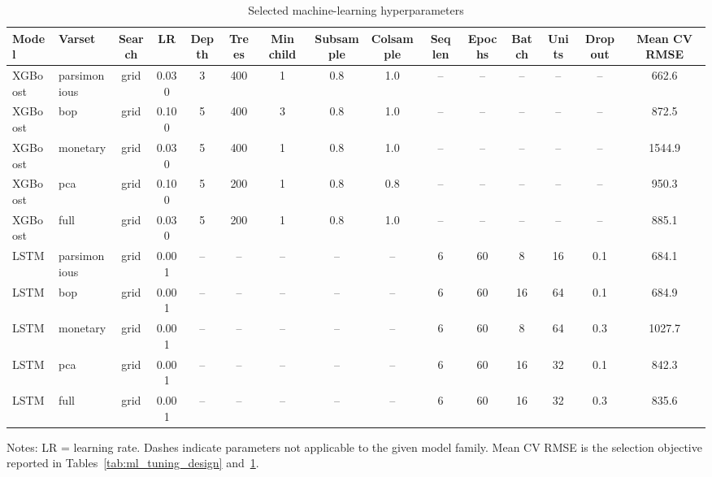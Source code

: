 \begin{table}[htbp]
\centering
\scriptsize
\caption{Selected machine-learning hyperparameters}
\label{tab:ml_tuning_selected}
\begin{tabular}{llccccccccccccc}
\toprule
Model & Varset & Search & LR & Depth & Trees & Min child & Subsample & Colsample & Seq len & Epochs & Batch & Units & Dropout & Mean CV RMSE \\
\midrule
XGBoost & parsimonious & grid & 0.030 & 3 & 400 & 1 & 0.8 & 1.0 & -- & -- & -- & -- & -- & 662.6 \\
XGBoost & bop & grid & 0.100 & 5 & 400 & 3 & 0.8 & 1.0 & -- & -- & -- & -- & -- & 872.5 \\
XGBoost & monetary & grid & 0.030 & 5 & 400 & 1 & 0.8 & 1.0 & -- & -- & -- & -- & -- & 1544.9 \\
XGBoost & pca & grid & 0.100 & 5 & 200 & 1 & 0.8 & 0.8 & -- & -- & -- & -- & -- & 950.3 \\
XGBoost & full & grid & 0.030 & 5 & 200 & 1 & 0.8 & 1.0 & -- & -- & -- & -- & -- & 885.1 \\
LSTM & parsimonious & grid & 0.001 & -- & -- & -- & -- & -- & 6 & 60 & 8 & 16 & 0.1 & 684.1 \\
LSTM & bop & grid & 0.001 & -- & -- & -- & -- & -- & 6 & 60 & 16 & 64 & 0.1 & 684.9 \\
LSTM & monetary & grid & 0.001 & -- & -- & -- & -- & -- & 6 & 60 & 8 & 64 & 0.3 & 1027.7 \\
LSTM & pca & grid & 0.001 & -- & -- & -- & -- & -- & 6 & 60 & 16 & 32 & 0.1 & 842.3 \\
LSTM & full & grid & 0.001 & -- & -- & -- & -- & -- & 6 & 60 & 16 & 32 & 0.3 & 835.6 \\
\bottomrule
\end{tabular}
\begin{tablenotes}
\footnotesize
\item Notes: LR = learning rate. Dashes indicate parameters not applicable to the given model family. 
Mean CV RMSE is the selection objective reported in Tables~\ref{tab:ml_tuning_design} and~\ref{tab:ml_tuning_selected}.
\end{tablenotes}
\end{table}